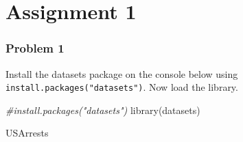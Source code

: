 \documentclass[
]{article}
\newenvironment{Shaded}{\begin{snugshade}}{\end{snugshade}}
\newcommand{\CommentTok}[1]{\textcolor[rgb]{0.56,0.35,0.01}{\textit{#1}}}
\newcommand{\FunctionTok}[1]{\textcolor[rgb]{0.00,0.00,0.00}{#1}}
\newcommand{\NormalTok}[1]{#1}
\begin{document}
\hypertarget{assignment-1}{%
\section{Assignment 1}\label{assignment-1}}

\hypertarget{problem-1}{%
\subsubsection{Problem 1}\label{problem-1}}

Install the datasets package on the console below using
\texttt{install.packages("datasets")}. Now load the library.

\begin{Shaded}
\begin{Highlighting}[]
\CommentTok{\#install.packages("datasets")}
\FunctionTok{library}\NormalTok{(datasets)}

\NormalTok{USArrests}
\end{Highlighting}
\end{Shaded}
\end{document}
